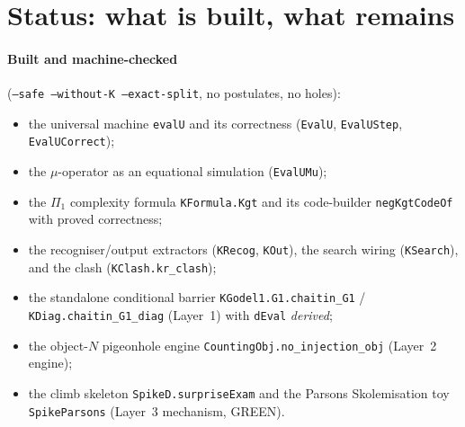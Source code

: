 \documentclass[11pt]{article}
\theoremstyle{plain}
\theoremstyle{definition}
\theoremstyle{remark}
\begin{document}
\section{Status: what is built, what remains}

\paragraph{Built and machine-checked} (\texttt{--safe --without-K --exact-split},
no postulates, no holes):
\begin{itemize}
\item the universal machine \texttt{evalU} and its correctness
  (\texttt{EvalU}, \texttt{EvalUStep}, \texttt{EvalUCorrect});
\item the $\mu$-operator as an equational simulation (\texttt{EvalUMu});
\item the $\Pi_1$ complexity formula \texttt{KFormula.Kgt} and its code-builder
  \texttt{negKgtCodeOf} with proved correctness;
\item the recogniser/output extractors (\texttt{KRecog}, \texttt{KOut}), the
  search wiring (\texttt{KSearch}), and the clash (\texttt{KClash.kr\_clash});
\item the standalone conditional barrier
  \texttt{KGodel1.G1.chaitin\_G1} / \texttt{KDiag.chaitin\_G1\_diag}
  (Layer~1) with \texttt{dEval} \emph{derived};
\item the object-$N$ pigeonhole engine \texttt{CountingObj.no\_injection\_obj}
  (Layer~2 engine);
\item the climb skeleton \texttt{SpikeD.surpriseExam} and the Parsons
  Skolemisation toy \texttt{SpikeParsons} (Layer~3 mechanism, GREEN).
\end{itemize}
\end{document}
